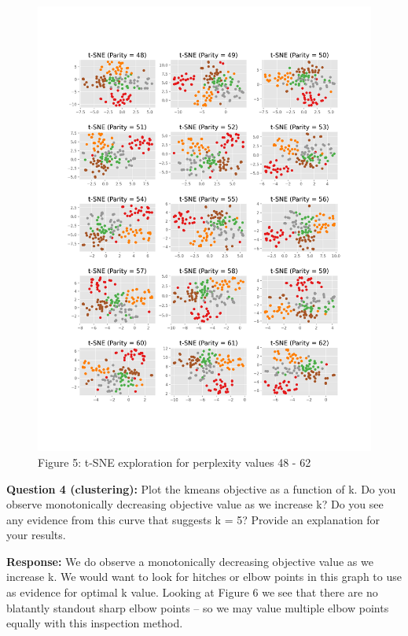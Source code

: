 \documentclass[12pt,article]{article}
\begin{document}
\begin{figure}[H]
\centering
\includegraphics[scale = 0.55]{images/sne_exploration4.png}    
\captionsetup{labelformat=empty}
\vspace{-75pt}
\caption{\scriptsize{Figure 5: t-SNE exploration for perplexity values 48 - 62}}
\end{figure}


\newpage
\textbf{Question 4 (clustering):}\newline
Plot the kmeans objective as a function of k. Do you observe monotonically decreasing objective value as we increase k? Do you see any evidence from this curve that suggests k = 5? Provide an explanation for your results. \newline

\textbf{Response:}\newline
We do observe a monotonically decreasing objective value as we increase k. We would want to look for hitches or elbow points in this graph to use as evidence for optimal k value.  Looking at Figure 6 we see that there are no blatantly standout sharp elbow points -- so we may value multiple elbow points equally with this inspection method. \newline 
\end{document}
